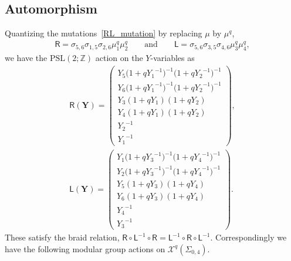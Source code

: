 \documentclass[pdftex]{sigma}
\numberwithin{equation}{section}
\begin{document}
\subsection*{Automorphism}
Quantizing the mutations~\eqref{RL_mutation} by replacing $\mu$ by $\mu^q$,
\begin{gather*}
\mathsf{R}= \sigma_{5,6} \sigma_{1,5} \sigma_{2,6} \mu^q_1 \mu^q_2 \qquad \text{and} \qquad \mathsf{L}=\sigma_{5,6} \sigma_{3,5} \sigma_{4,6} \mu^q_3 \mu^q_4,
\end{gather*} we have the $\mathrm{PSL}(2;\mathbb{Z})$ action on the $Y$-variables as
\begin{gather*}
 \mathsf{R}(\boldsymbol{Y}) =
 \begin{pmatrix}
 Y_5 \big( 1+q {Y_1}^{-1} \big)^{-1} \big( 1+q {Y_2}^{-1} \big)^{-1} \\
 Y_6 \big( 1+q {Y_1}^{-1} \big)^{-1} \big( 1+q {Y_2}^{-1} \big)^{-1} \\
 Y_3 ( 1+q Y_1 ) (1+q Y_2) \\
 Y_4 ( 1+q Y_1) ( 1+q Y_2) \\
 {Y_2}^{-1} \\
 {Y_1}^{-1}
 \end{pmatrix} , \\
 \mathsf{L}(\boldsymbol{Y}) =
 \begin{pmatrix}
 Y_1 \big( 1+q {Y_3}^{-1} \big)^{-1} \big( 1+q {Y_4}^{-1}\big)^{-1} \\
 Y_2 \big( 1+q {Y_3}^{-1} \big)^{-1} \big( 1+q {Y_4}^{-1} \big)^{-1} \\
 Y_5 ( 1+q Y_3)( 1+q Y_4) \\
 Y_6 ( 1+q Y_3)( 1+q Y_4) \\
 {Y_4}^{-1} \\
 {Y_3}^{-1}
 \end{pmatrix} .
\end{gather*}
These satisfy the braid relation, $\mathsf{R} \circ \mathsf{L}^{-1} \circ \mathsf{R} = \mathsf{L}^{-1} \circ \mathsf{R} \circ \mathsf{L}^{-1}$. Correspondingly we have the following modular group actions on $\mathcal{X}^q(\Sigma_{0,4})$.
\end{document}
